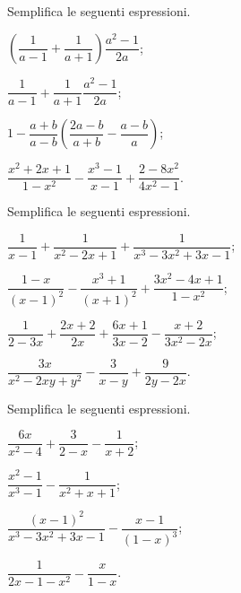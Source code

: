 \begin{esercizio}[\Ast]
\label{ese:14.33}
Semplifica le seguenti espressioni.
\begin{multicols}{2}
\begin{enumeratea}
 \item $\left(\dfrac{1}{a-1}+\dfrac{1}{a+1}\right)\dfrac{a^{2}-1}{2a}$;
 \item $\dfrac{1}{a-1}+\dfrac{1}{a+1}\dfrac{a^{2}-1}{2a}$;
 \item $1-\dfrac{a+b}{a-b} \left(\dfrac{2a-b}{a+b}-\dfrac{a-b}{a}\right)$;
 \item $\dfrac{x^{2}+2x+1}{1-x^{2}}-\dfrac{x^{3}-1}{x-1}+\dfrac{2-8x^{2}}{4x^{2}-1}$.
\end{enumeratea}
\end{multicols}
\end{esercizio}

\begin{esercizio}[\Ast]
\label{ese:14.34}
Semplifica le seguenti espressioni.
\begin{multicols}{2}
\begin{enumeratea}
 \item $\dfrac{1}{x-1}+\dfrac{1}{x^{2}-2x+1}+\dfrac{1}{x^{3}-3x^{2}+3x-1}$;
 \item $\dfrac{1-x}{(x-1)^{2}}-\dfrac{x^{3}+1}{(x+1)^{2}}+\dfrac{3x^{2}-4x+1}{1-x^{2}}$;
 \item $\dfrac{1}{2-3x}+\dfrac{2x+2}{2x}+\dfrac{6x+1}{3x-2}-\dfrac{x+2}{3x^{2}-2x}$;
 \item $\dfrac{3x}{x^{2}-2xy+y^{2}}-\dfrac{3}{x-y}+\dfrac{9}{2y-2x}$.
\end{enumeratea}
\end{multicols}
\end{esercizio}
\pagebreak
\begin{esercizio}[\Ast]
\label{ese:14.35}
Semplifica le seguenti espressioni.
\begin{multicols}{2}
\begin{enumeratea}
 \item $\dfrac{6x}{x^{2}-4}+\dfrac{3}{2-x}-\dfrac{1}{x+2}$;
 \item $\dfrac{x^{2}-1}{x^{3}-1}-\dfrac{1}{x^{2}+x+1}$;
 \item $\dfrac{(x-1)^{2}}{x^{3}-3x^{2}+3x-1}-\dfrac{x-1}{(1-x)^{3}}$;
 \item $\dfrac{1}{2x-1-x^{2}}-\dfrac{x}{1-x}$.
\end{enumeratea}
\end{multicols}
\end{esercizio}

